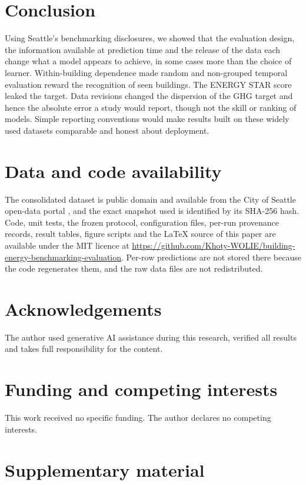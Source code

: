 \documentclass[11pt]{article}
\begin{document}
\section{Conclusion}
\label{sec:conclusion}
Using Seattle's benchmarking disclosures, we showed that the evaluation design, the information available at prediction time and the release of the data each change what a model appears to achieve, in some cases more than the choice of learner. Within-building dependence made random and non-grouped temporal evaluation reward the recognition of seen buildings. The ENERGY STAR score leaked the target. Data revisions changed the dispersion of the GHG target and hence the absolute error a study would report, though not the skill or ranking of models. Simple reporting conventions would make results built on these widely used datasets comparable and honest about deployment.

\section*{Data and code availability}
The consolidated dataset is public domain and available from the City of Seattle open-data portal \cite{seattle2026benchmarking}, and the exact snapshot used is identified by its SHA-256 hash. Code, unit tests, the frozen protocol, configuration files, per-run provenance records, result tables, figure scripts and the LaTeX source of this paper are available under the MIT licence at \url{https://github.com/Khoty-WOLIE/building-energy-benchmarking-evaluation}. Per-row predictions are not stored there because the code regenerates them, and the raw data files are not redistributed.

\section*{Acknowledgements}
The author used generative AI assistance during this research, verified all results and takes full responsibility for the content.

\section*{Funding and competing interests}
This work received no specific funding. The author declares no competing interests.




\appendix
\section{Supplementary material}
\begin{table}[H]
\centering\small
\caption{Construction of the analysis population (consolidated release, 2015 to 2025).}
\label{tab:attrition}

\end{table}
\end{document}
